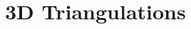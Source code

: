 \chapter{3D Triangulations}
\label{chapter-Triangulation3}

\vspace*{-15mm}
\minitoc
\vspace*{30mm}



